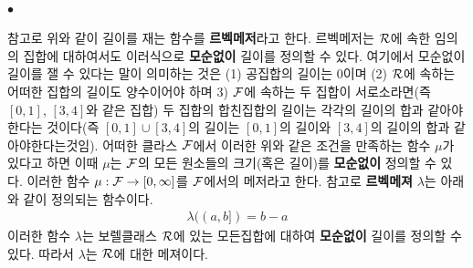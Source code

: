 \documentclass[12pt,oneside,english,a4paper]{article}
\def\ck{\paragraph{\Large$\bullet$}\Large}
\begin{document}
\ck 참고로 위와 같이 길이를 재는 함수를 \textbf{르벡메저}라고 한다. 르벡메저는 $\cal R$에 속한 임의의 집합에 대하여서도 이러식으로 \textbf{모순없이} 길이를 정의할 수 있다. 여기에서 모순없이 길이를 잴 수 있다는 말이 의미하는 것은 (1) 공집합의 길이는 0이며 (2) $\cal R$에 속하는 어떠한 집합의 길이도 양수이어야 하며 3) $\cal F$에 속하는 두 집합이 서로소라면(즉 $[0,1]$, $[3,4]$와 같은 집합) 두 집합의 합친집합의 길이는 각각의 길이의 합과 같아야 한다는 것이다(즉 $[0,1]\cup[3,4]$의 길이는 $[0,1]$의 길이와 $[3,4]$의 길이의 합과 같아야한다는것임). 어떠한 클라스 $\cal F$에서 이러한 위와 같은 조건을 만족하는 함수 $\mu$가 있다고 하면 이때 $\mu$는 $\cal F$의 모든 원소들의 크기(혹은 길이)를 \textbf{모순없이} 정의할 수 있다. 이러한 함수 $\mu :{\cal F} \rightarrow [0,\infty]$를 $\cal F$에서의 메저라고 한다. 참고로 \textbf{르벡메져} $\lambda$는 아래와 같이 정의되는 함수이다. 
\begin{align*}
\lambda((a,b])=b-a
\end{align*}
이러한 함수 $\lambda$는 보렐클래스 $\cal R$에 있는 모든집합에 대하여 \textbf{모순없이} 길이를 정의할 수 있다. 따라서 $\lambda$는 $\cal R$에 대한 메져이다. 
\end{document}
